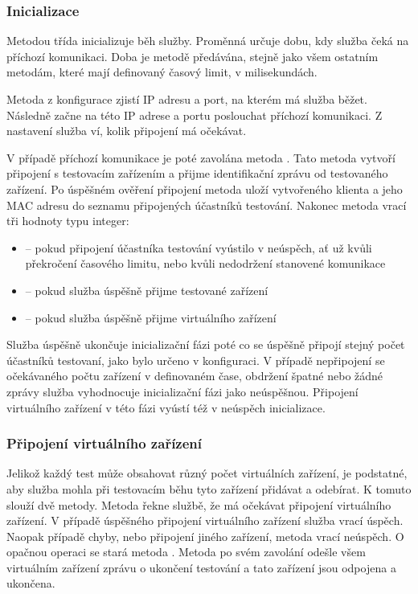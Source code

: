 \subsubsection{Inicializace}

Metodou  třída  inicializuje běh služby. Proměnná  určuje dobu, kdy služba čeká na příchozí komunikaci. Doba je metodě předávána, stejně jako všem ostatním metodám, které mají definovaný časový limit, v milisekundách. 

Metoda z konfigurace zjistí IP adresu a port, na kterém má služba běžet. Následně začne na této IP adrese a portu poslouchat příchozí komunikaci. Z nastavení služba ví, kolik připojení má očekávat. 

V případě příchozí komunikace je poté zavolána metoda . Tato metoda vytvoří připojení s testovacím zařízením a přijme identifikační zprávu od testovaného zařízení. Po úspěšném ověření připojení metoda uloží vytvořeného klienta a jeho MAC adresu do seznamu připojených účastníků testování. Nakonec metoda vrací tři hodnoty typu integer:
\begin{itemize}
    \item {} -- pokud připojení účastníka testování vyústilo v neúspěch, ať už kvůli překročení časového limitu, nebo kvůli nedodržení stanovené komunikace
    \item {} -- pokud služba úspěšně přijme testované zařízení
    \item {} -- pokud služba úspěšně přijme virtuálního zařízení
\end{itemize}

Služba úspěšně ukončuje inicializační fázi poté co se úspěšně připojí stejný počet účastníků testovaní, jako bylo určeno v konfiguraci. V případě nepřipojení se očekávaného počtu zařízení v definovaném čase, obdržení špatné nebo žádné zprávy služba vyhodnocuje inicializační fázi jako neúspěšnou. Připojení virtuálního zařízení v této fázi vyústí též v neúspěch inicializace.

\subsubsection{Připojení virtuálního zařízení}

Jelikož každý test může obsahovat různý počet virtuálních zařízení, je podstatné, aby služba mohla při testovacím běhu tyto zařízení přidávat a odebírat. K tomuto slouží dvě metody. Metoda  řekne službě, že má očekávat připojení virtuálního zařízení. V případě úspěšného připojení virtuálního zařízení služba vrací úspěch. Naopak případě chyby, nebo připojení jiného zařízení, metoda vrací neúspěch. O opačnou operaci se stará metoda . Metoda po svém zavolání odešle všem virtuálním zařízení zprávu o ukončení testování a tato zařízení jsou odpojena a ukončena.

